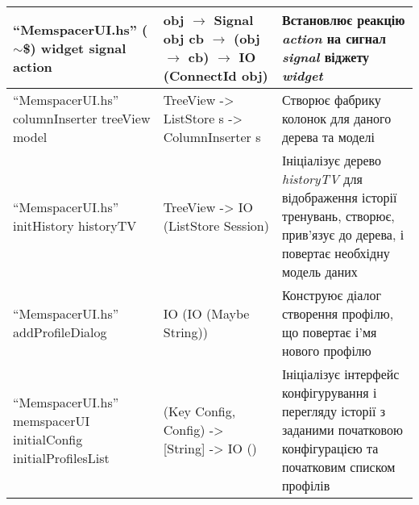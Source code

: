 \begin{longtable}{| C{6cm} | C{4cm} | C{5cm} |}
  \hline
  ``MemspacerUI.hs'' \newline ($\sim$\$) \newline widget signal action
  & obj \newline $\to$ Signal obj cb \newline
  $\to$ (obj $\to$ cb) \newline $\to$ IO (ConnectId obj)
  & Встановлює реакцію \emph{action} на сигнал \emph{signal} віджету \emph{widget} \\
  \hline
  ``MemspacerUI.hs'' \newline columnInserter \newline treeView model
  & TreeView -> ListStore s -> ColumnInserter s
  & Створює фабрику колонок для даного дерева та моделі \\
  \hline
  ``MemspacerUI.hs'' \newline initHistory \newline historyTV
  & TreeView -> IO (ListStore Session)
  & Ініціалізує дерево \emph{historyTV} для відображення історії тренувань,
  створює, прив'язує до дерева, і повертає необхідну модель даних \\
  \hline
  ``MemspacerUI.hs'' \newline addProfileDialog
  & IO (IO (Maybe String))
  & Конструює діалог створення профілю, що повертає і'мя нового профілю \\
  \hline
  ``MemspacerUI.hs'' \newline memspacerUI \newline
  initialConfig initialProfilesList
  & (Key Config, Config) -> [String] -> IO ()
  & Ініціалізує інтерфейс конфігурування і перегляду історії
  з заданими початковою конфігурацією та початковим списком профілів \\
  \hline
\end{longtable}\normalsize